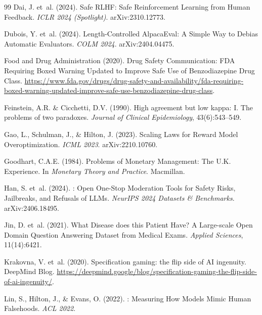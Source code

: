 \documentclass{article}
\begin{document}
\begin{thebibliography}{99}
Dai, J. et~al. (2024).
\newblock Safe {RLHF}: Safe Reinforcement Learning from Human Feedback.
\newblock \emph{ICLR 2024 (Spotlight)}. arXiv:2310.12773.

Dubois, Y. et~al. (2024).
\newblock Length-Controlled {AlpacaEval}: A Simple Way to Debias Automatic Evaluators.
\newblock \emph{COLM 2024}. arXiv:2404.04475.

Food and Drug Administration (2020).
 Drug Safety Communication: {FDA} Requiring Boxed Warning Updated to Improve Safe Use of Benzodiazepine Drug Class.
\newblock \url{https://www.fda.gov/drugs/drug-safety-and-availability/fda-requiring-boxed-warning-updated-improve-safe-use-benzodiazepine-drug-class}.

Feinstein, A.R. \& Cicchetti, D.V. (1990).
\newblock High agreement but low kappa: {I}. {T}he problems of two paradoxes.
\newblock \emph{Journal of Clinical Epidemiology}, 43(6):543--549.

Gao, L., Schulman, J., \& Hilton, J. (2023).
\newblock Scaling Laws for Reward Model Overoptimization.
\newblock \emph{ICML 2023}. arXiv:2210.10760.

Goodhart, C.A.E. (1984).
\newblock Problems of Monetary Management: The {U.K.} Experience.
\newblock In \emph{Monetary Theory and Practice}. Macmillan.

Han, S. et~al. (2024).
: Open One-Stop Moderation Tools for Safety Risks, Jailbreaks, and Refusals of {LLMs}.
\newblock \emph{NeurIPS 2024 Datasets \& Benchmarks}. arXiv:2406.18495.

Jin, D. et~al. (2021).
\newblock What Disease does this Patient Have? {A} Large-scale Open Domain Question Answering Dataset from Medical Exams.
\newblock \emph{Applied Sciences}, 11(14):6421.

Krakovna, V. et~al. (2020).
\newblock Specification gaming: the flip side of {AI} ingenuity.
\newblock DeepMind Blog. \url{https://deepmind.google/blog/specification-gaming-the-flip-side-of-ai-ingenuity/}.

Lin, S., Hilton, J., \& Evans, O. (2022).
: Measuring How Models Mimic Human Falsehoods.
\newblock \emph{ACL 2022}.


\end{thebibliography}
\end{document}
